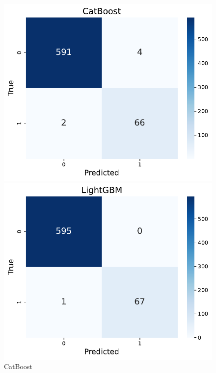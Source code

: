 \documentclass[10pt,letterpaper]{article}
\begin{document}
\begin{figure}[H]
    \centering
    \begin{minipage}{0.32\textwidth}
        \centering
        \includegraphics[width=\linewidth]{plots/cb_confusion_matrix.pdf}
        \caption{CatBoost}
        \label{fig:cm-cb}
    \end{minipage}\hfill
    \begin{minipage}{0.32\textwidth}
        \centering
        \includegraphics[width=\linewidth]{plots/lgbm_confusion_matrix.pdf}

\end{minipage}
\end{figure}
\end{document}
